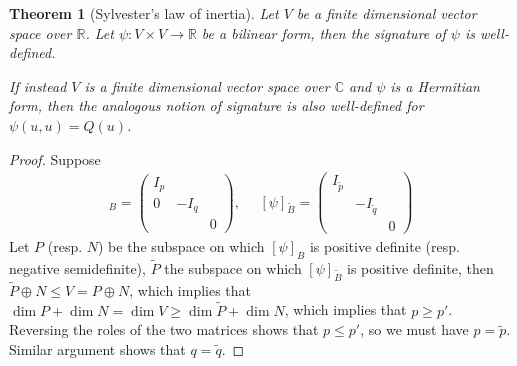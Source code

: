 \documentclass{article}
\theoremstyle{definition}
\theoremstyle{remark}
\theoremstyle{plain}
\newtheorem{thm}[defn]{Theorem}
\newcommand{\RR}{\mathbb{R}}
\newcommand{\CC}{\mathbb{C}}
\begin{document}
\begin{thm}[Sylvester's law of inertia]
Let $V$ be a finite dimensional vector space over $\RR$. Let $\psi:V\times V\to \RR$ be a bilinear form, then the signature of $\psi$ is well-defined.

If instead $V$ is a finite dimensional vector space over $\CC$ and $\psi$ is a Hermitian form, then the analogous notion of signature is also well-defined for $\psi(u,u)=Q(u)$.
\end{thm}
\begin{proof}
    Suppose 
    \begin{align*}
        [\psi]_B=\begin{pmatrix}
            I_p &&\\ 0&-I_q & \\ &&0
        \end{pmatrix},\text{ }\text{ }[\psi]_{\tilde{B}}=\begin{pmatrix}
            I_{\tilde{p}} &&\\ & -I_{\tilde{q}}\\ &&0
        \end{pmatrix}
    \end{align*}
    Let $P$ (resp. $N$) be the subspace on which $[\psi]_B$ is positive definite (resp. negative semidefinite), $\tilde P$ the subspace on which $[\psi]_{\tilde B}$ is positive definite, then $\tilde P\oplus N\le V=P\oplus N$, which implies that $\dim P+\dim N=\dim V\ge \dim \tilde P+\dim N$, which implies that $p\ge p'$. Reversing the roles of the two matrices shows that $p\le p'$, so we must have $p=\tilde p$. Similar argument shows that $q=\tilde q$.
\end{proof}
\end{document}
